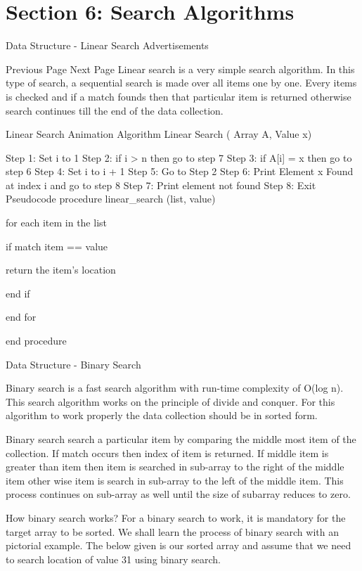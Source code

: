 \section{Section 6: Search Algorithms}
\begin{frame}
Data Structure - Linear Search
Advertisements

 
 Previous Page Next Page  
Linear search is a very simple search algorithm. In this type of search, a sequential search is made over all items one by one. Every items is checked and if a match founds then that particular item is returned otherwise search continues till the end of the data collection.

Linear Search Animation
Algorithm
Linear Search ( Array A, Value x)

Step 1: Set i to 1
Step 2: if i > n then go to step 7
Step 3: if A[i] = x then go to step 6
Step 4: Set i to i + 1
Step 5: Go to Step 2
Step 6: Print Element x Found at index i and go to step 8
Step 7: Print element not found
Step 8: Exit
Pseudocode
procedure linear_search (list, value)

   for each item in the list

      if match item == value

         return the item's location

      end if

   end for

end procedure 

Data Structure - Binary Search

\begin{frame} 
Binary search is a fast search algorithm with run-time complexity of Ο(log n). This search algorithm works on the principle of divide and conquer. For this algorithm to work properly the data collection should be in sorted form.

Binary search search a particular item by comparing the middle most item of the collection. If match occurs then index of item is returned. If middle item is greater than item then item is searched in sub-array to the right of the middle item other wise item is search in sub-array to the left of the middle item. This process continues on sub-array as well until the size of subarray reduces to zero.
\end{frame}
\begin{frame}
How binary search works?
For a binary search to work, it is mandatory for the target array to be sorted. We shall learn the process of binary search with an pictorial example. The below given is our sorted array and assume that we need to search location of value 31 using binary search.


\end{frame}
\end{frame}
